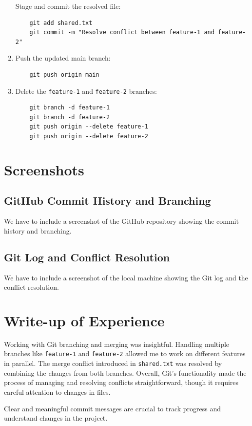 \documentclass[a4paper,12pt]{article}
\begin{document}
\begin{enumerate}
    Stage and commit the resolved file:
    \begin{verbatim}
    git add shared.txt
    git commit -m "Resolve conflict between feature-1 and feature-2"
    \end{verbatim}
    
    \item Push the updated main branch:
    \begin{verbatim}
    git push origin main
    \end{verbatim}
    
    \item Delete the \texttt{feature-1} and \texttt{feature-2} branches:
    \begin{verbatim}
    git branch -d feature-1
    git branch -d feature-2
    git push origin --delete feature-1
    git push origin --delete feature-2
    \end{verbatim}
\end{enumerate}

\section{Screenshots}

\subsection{GitHub Commit History and Branching}
We have to include a screenshot of the GitHub repository showing the commit history and branching.

\subsection{Git Log and Conflict Resolution}
We have to include a screenshot of the local machine showing the Git log and the conflict resolution.


\section{Write-up of Experience}
Working with Git branching and merging was insightful. Handling multiple branches like \texttt{feature-1} and \texttt{feature-2} allowed me to work on different features in parallel. The merge conflict introduced in \texttt{shared.txt} was resolved by combining the changes from both branches. Overall, Git's functionality made the process of managing and resolving conflicts straightforward, though it requires careful attention to changes in files.

Clear and meaningful commit messages are crucial to track progress and understand changes in the project.
\end{document}
